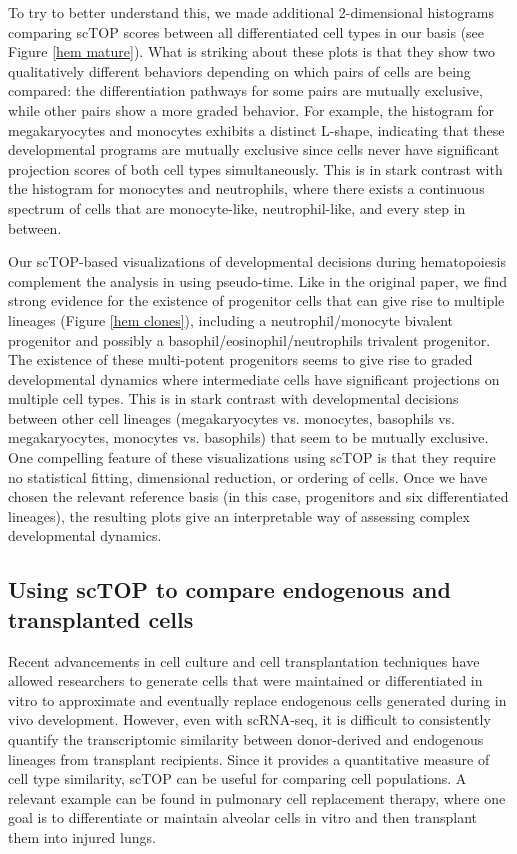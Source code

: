 \documentclass[vruler,JEB]{COB}%
\begin{document}
To try to better understand this, we made additional 2-dimensional histograms comparing scTOP scores between all differentiated cell types in our basis (see Figure \ref{hem mature}). What is striking about these plots is that they show two qualitatively different behaviors depending on which pairs of cells are being compared: the differentiation pathways for some pairs are mutually exclusive, while other pairs show a more graded behavior. For example, the histogram for megakaryocytes and monocytes exhibits a distinct L-shape, indicating that these developmental programs are mutually exclusive since cells never have significant projection scores of both cell types simultaneously. This is in stark contrast with the histogram for monocytes and neutrophils, where there exists a continuous spectrum of cells that are monocyte-like, neutrophil-like, and every step in between. 

Our scTOP-based visualizations of developmental decisions during hematopoiesis complement the analysis in \cite{weinreb_lineage_2020} using pseudo-time. Like in the original paper, we find strong evidence for the existence of progenitor cells that can give rise to multiple lineages (Figure \ref{hem clones}), including a neutrophil/monocyte bivalent progenitor and possibly a basophil/eosinophil/neutrophils trivalent progenitor.  The existence of these multi-potent progenitors seems to give rise to graded developmental dynamics where intermediate cells have significant projections on multiple cell types. This is in stark contrast with developmental decisions between other cell lineages (megakaryocytes vs. monocytes, basophils vs. megakaryocytes, monocytes vs. basophils) that seem to be mutually exclusive. One compelling feature of these visualizations using scTOP is that they require no statistical fitting, dimensional reduction, or ordering of cells. Once we have chosen the relevant reference basis (in this case, progenitors and six differentiated lineages), the resulting plots give an interpretable way of assessing complex developmental dynamics.

\subsection{Using scTOP to compare endogenous and transplanted cells}

Recent advancements in cell culture and cell transplantation techniques have allowed researchers to generate cells that were maintained or differentiated in vitro to approximate and eventually replace endogenous cells generated during in vivo development. However, even with scRNA-seq, it is difficult to consistently quantify the transcriptomic similarity between donor-derived and endogenous lineages from transplant recipients. Since it provides a quantitative measure of cell type similarity, scTOP can be useful for comparing cell populations. A relevant example can be found in pulmonary cell replacement therapy, where one goal is to differentiate or maintain alveolar cells in vitro and then transplant them into injured lungs. 
\end{document}
